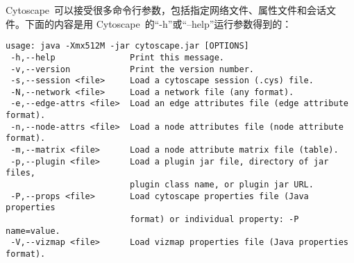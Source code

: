 Cytoscape~可以接受很多命令行参数，包括指定网络文件、属性文件和会话文件。下面的内容是用
Cytoscape~的“-h”或“--help”运行参数得到的：
\begin{verbatim}
usage: java -Xmx512M -jar cytoscape.jar [OPTIONS]
 -h,--help               Print this message.
 -v,--version            Print the version number.
 -s,--session <file>     Load a cytoscape session (.cys) file.
 -N,--network <file>     Load a network file (any format).
 -e,--edge-attrs <file>  Load an edge attributes file (edge attribute format).
 -n,--node-attrs <file>  Load a node attributes file (node attribute format).
 -m,--matrix <file>      Load a node attribute matrix file (table).
 -p,--plugin <file>      Load a plugin jar file, directory of jar files,
                         plugin class name, or plugin jar URL.
 -P,--props <file>       Load cytoscape properties file (Java properties
                         format) or individual property: -P name=value.
 -V,--vizmap <file>      Load vizmap properties file (Java properties format).
\end{verbatim}

